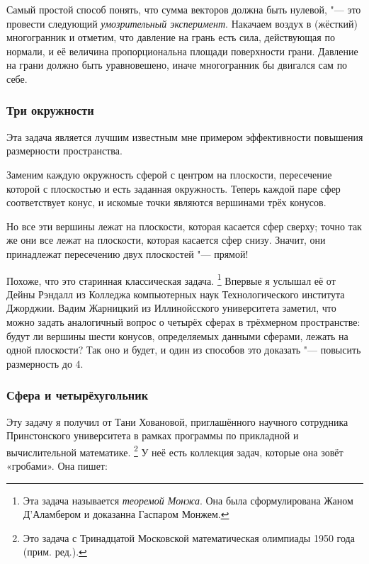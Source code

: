 \documentclass[twoside]{book}
\begin{document}
\medskip
 
Самый простой способ понять, что сумма векторов должна быть нулевой, "--- это провести следующий \emph{умозрительный эксперимент}.
Накачаем воздух в (жёсткий) многогранник и отметим, что давление на грань есть сила, действующая по нормали, и её величина пропорциональна площади поверхности грани.
Давление на грани должно быть уравновешено, иначе многогранник бы двигался сам по себе.
\heart

\subsubsection*{Три окружности}%

Эта задача является лучшим известным мне примером эффективности повышения размерности пространства.

\medskip

Заменим каждую окружность сферой с центром на плоскости, пересечение которой с плоскостью и есть заданная окружность.
Теперь каждой паре сфер соответствует конус, и искомые точки являются вершинами трёх конусов. %

Но все эти вершины лежат на плоскости, которая касается сфер сверху;
точно так же они все лежат на плоскости, которая касается сфер снизу.
Значит, они принадлежат пересечению двух плоскостей "--- прямой! \heart

Похоже, что это старинная классическая задача.%
\footnote{Эта задача называется \emph{теоремой Монжа}. Она была сформулирована Жаном Д’Аламбером и доказанна Гаспаром Монжем.}
Впервые я услышал её от Дейны Рэндалл %
из Колледжа компьютерных наук Технологического института Джорджии.
Вадим Жарницкий из Иллинойсского университета заметил, что можно задать аналогичный вопрос о четырёх сферах в трёхмерном пространстве: будут ли вершины шести конусов, определяемых данными сферами, лежать на одной плоскости?
Так оно и будет, и один из способов это доказать "--- повысить размерность до 4.

\subsubsection*{Сфера и четырёхугольник}%

Эту задачу я получил от Тани Ховановой, приглашённого научного сотрудника Принстонского университета в рамках программы по прикладной и вычислительной математике.%
\footnote{Это задача с Тринадцатой Московской математическая олимпиады 1950 года
\cite[13.17]{МосковскиеМО} (прим. ред.).}
У неё есть коллекция задач, которые она зовёт «гробами».
Она пишет:
\end{document}

